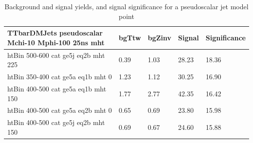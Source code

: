 \begin{table}
\small
\begin{center}
\caption{Background and signal yields, and signal significance for a pseudoscalar \DMtt jet model point}
\label{tab:MSB_DMttP_2fb}
\begin{tabular}{|l|l|l|l|l|}
\textbf{TTbarDMJets pseudoscalar Mchi-10 Mphi-100 25ns mht}  &  bgTtw    &  bgZinv   &  Signal &     Significance \\ 
\hline
htBin 500-600 cat ge5j eq2b mht 225 &   0.39     &  1.03     &  28.23   &18.36 \\ 
htBin 350-400 cat ge5a eq1b mht 0 &     1.23     &  1.12     &  30.25   &16.90 \\ 
htBin 400-500 cat ge5a eq1b mht 150 &   1.77     &  2.77     &  42.35   &16.42 \\ 
htBin 400-500 cat ge5a eq2b mht 0 &     0.65     &  0.69     &  23.80   &15.98 \\ 
htBin 400-500 cat ge5j eq2b mht 150 &   0.69     &  0.67     &  24.60   &15.88 \\ 
\end{tabular}
\end{center}
\end{table}



